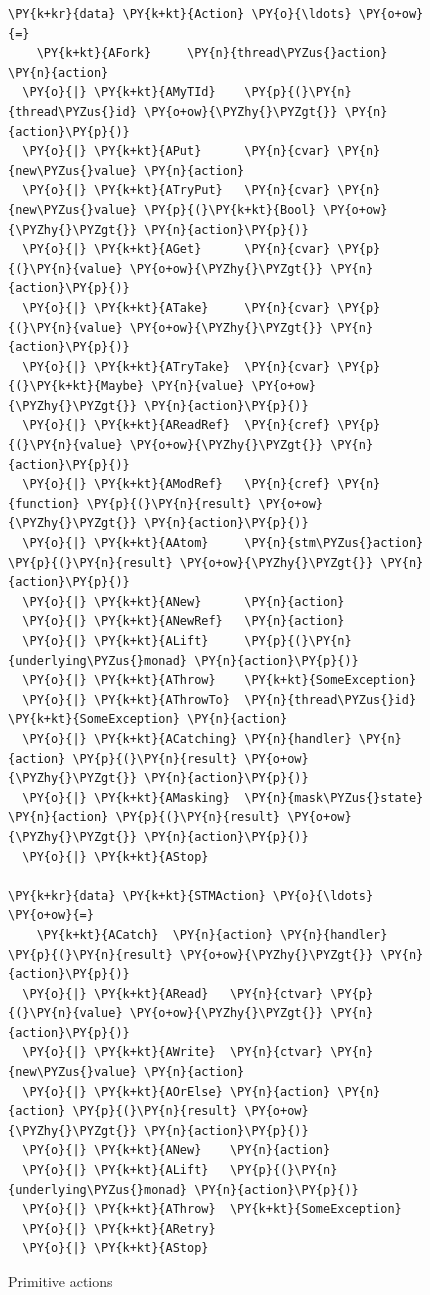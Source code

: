 \begin{figure}[t]
\begin{Verbatim}[commandchars=\\\{\}]
\PY{k+kr}{data} \PY{k+kt}{Action} \PY{o}{\ldots} \PY{o+ow}{=}
    \PY{k+kt}{AFork}     \PY{n}{thread\PYZus{}action} \PY{n}{action}
  \PY{o}{|} \PY{k+kt}{AMyTId}    \PY{p}{(}\PY{n}{thread\PYZus{}id} \PY{o+ow}{\PYZhy{}\PYZgt{}} \PY{n}{action}\PY{p}{)}
  \PY{o}{|} \PY{k+kt}{APut}      \PY{n}{cvar} \PY{n}{new\PYZus{}value} \PY{n}{action}
  \PY{o}{|} \PY{k+kt}{ATryPut}   \PY{n}{cvar} \PY{n}{new\PYZus{}value} \PY{p}{(}\PY{k+kt}{Bool} \PY{o+ow}{\PYZhy{}\PYZgt{}} \PY{n}{action}\PY{p}{)}
  \PY{o}{|} \PY{k+kt}{AGet}      \PY{n}{cvar} \PY{p}{(}\PY{n}{value} \PY{o+ow}{\PYZhy{}\PYZgt{}} \PY{n}{action}\PY{p}{)}
  \PY{o}{|} \PY{k+kt}{ATake}     \PY{n}{cvar} \PY{p}{(}\PY{n}{value} \PY{o+ow}{\PYZhy{}\PYZgt{}} \PY{n}{action}\PY{p}{)}
  \PY{o}{|} \PY{k+kt}{ATryTake}  \PY{n}{cvar} \PY{p}{(}\PY{k+kt}{Maybe} \PY{n}{value} \PY{o+ow}{\PYZhy{}\PYZgt{}} \PY{n}{action}\PY{p}{)}
  \PY{o}{|} \PY{k+kt}{AReadRef}  \PY{n}{cref} \PY{p}{(}\PY{n}{value} \PY{o+ow}{\PYZhy{}\PYZgt{}} \PY{n}{action}\PY{p}{)}
  \PY{o}{|} \PY{k+kt}{AModRef}   \PY{n}{cref} \PY{n}{function} \PY{p}{(}\PY{n}{result} \PY{o+ow}{\PYZhy{}\PYZgt{}} \PY{n}{action}\PY{p}{)}
  \PY{o}{|} \PY{k+kt}{AAtom}     \PY{n}{stm\PYZus{}action} \PY{p}{(}\PY{n}{result} \PY{o+ow}{\PYZhy{}\PYZgt{}} \PY{n}{action}\PY{p}{)}
  \PY{o}{|} \PY{k+kt}{ANew}      \PY{n}{action}
  \PY{o}{|} \PY{k+kt}{ANewRef}   \PY{n}{action}
  \PY{o}{|} \PY{k+kt}{ALift}     \PY{p}{(}\PY{n}{underlying\PYZus{}monad} \PY{n}{action}\PY{p}{)}
  \PY{o}{|} \PY{k+kt}{AThrow}    \PY{k+kt}{SomeException}
  \PY{o}{|} \PY{k+kt}{AThrowTo}  \PY{n}{thread\PYZus{}id} \PY{k+kt}{SomeException} \PY{n}{action}
  \PY{o}{|} \PY{k+kt}{ACatching} \PY{n}{handler} \PY{n}{action} \PY{p}{(}\PY{n}{result} \PY{o+ow}{\PYZhy{}\PYZgt{}} \PY{n}{action}\PY{p}{)}
  \PY{o}{|} \PY{k+kt}{AMasking}  \PY{n}{mask\PYZus{}state} \PY{n}{action} \PY{p}{(}\PY{n}{result} \PY{o+ow}{\PYZhy{}\PYZgt{}} \PY{n}{action}\PY{p}{)}
  \PY{o}{|} \PY{k+kt}{AStop}

\PY{k+kr}{data} \PY{k+kt}{STMAction} \PY{o}{\ldots} \PY{o+ow}{=}
    \PY{k+kt}{ACatch}  \PY{n}{action} \PY{n}{handler} \PY{p}{(}\PY{n}{result} \PY{o+ow}{\PYZhy{}\PYZgt{}} \PY{n}{action}\PY{p}{)}
  \PY{o}{|} \PY{k+kt}{ARead}   \PY{n}{ctvar} \PY{p}{(}\PY{n}{value} \PY{o+ow}{\PYZhy{}\PYZgt{}} \PY{n}{action}\PY{p}{)}
  \PY{o}{|} \PY{k+kt}{AWrite}  \PY{n}{ctvar} \PY{n}{new\PYZus{}value} \PY{n}{action}
  \PY{o}{|} \PY{k+kt}{AOrElse} \PY{n}{action} \PY{n}{action} \PY{p}{(}\PY{n}{result} \PY{o+ow}{\PYZhy{}\PYZgt{}} \PY{n}{action}\PY{p}{)}
  \PY{o}{|} \PY{k+kt}{ANew}    \PY{n}{action}
  \PY{o}{|} \PY{k+kt}{ALift}   \PY{p}{(}\PY{n}{underlying\PYZus{}monad} \PY{n}{action}\PY{p}{)}
  \PY{o}{|} \PY{k+kt}{AThrow}  \PY{k+kt}{SomeException}
  \PY{o}{|} \PY{k+kt}{ARetry}
  \PY{o}{|} \PY{k+kt}{AStop}
\end{Verbatim}
  \caption{Primitive actions}
  \label{fig:dejafu-impl-prims}
\end{figure}

